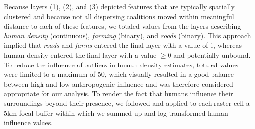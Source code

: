 \documentclass[abstract=off,10pt,a4paper,bibliography=totocnumbered]{article}
\begin{document}
\noindent Because layers (1), (2), and (3) depicted features that are typically
spatially clustered and because not all dispersing coalitions moved within
meaningful distance to each of these features, we totaled values from the layers
describing \textit{human density} (continuous), \textit{farming} (binary), and
\textit{roads} (binary). This approach implied that \textit{roads} and
\textit{farms} entered the final layer with a value of 1, whereas human density
entered the final layer with a value \(\geq 0\) and potentially unbound. To
reduce the influence of outliers in human density estimates, totaled values were
limited to a maximum of 50, which visually resulted in a good balance between
high and low anthropogenic influence and was therefore considered appropriate
for our analysis. To render the fact that humans influence their surroundings
beyond their presence, we followed \cite{Elliot.2014} and applied to each
raster-cell a 5km focal buffer within which we summed up and log-transformed
human-influence values.
\end{document}
